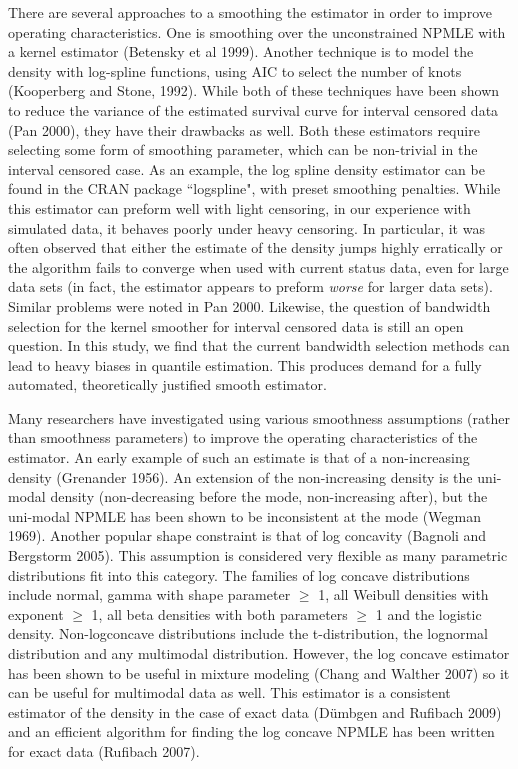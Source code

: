 \documentclass[12pt]{article}
\numberwithin{equation}{section}
\begin{document}
	There are several approaches to a smoothing the estimator in order to improve operating characteristics. One is smoothing over the unconstrained NPMLE with a kernel estimator (Betensky et al 1999). Another technique is to model the density with log-spline functions, using AIC to select the number of knots (Kooperberg and Stone, 1992). While both of these techniques have been shown to reduce the variance of the estimated survival curve for interval censored data (Pan 2000), they have their drawbacks as well. Both these estimators require selecting some form of smoothing parameter, which can be non-trivial in the interval censored case. As an example, the log spline density estimator can be found in the CRAN package  ``logspline", with preset smoothing penalties. While this estimator can preform well with light censoring, in our experience with simulated data, it behaves poorly under heavy censoring. In particular, it was often observed that either the estimate of the density jumps highly erratically or the algorithm fails to converge when used with current status data, even for large data sets (in fact, the estimator appears to preform \emph{worse} for larger data sets). Similar problems were noted in Pan 2000.  Likewise, the question of bandwidth selection for the kernel smoother for interval censored data is still an open question. In this study, we find that the current bandwidth selection methods can lead to heavy biases in quantile estimation. This produces demand for a fully automated, theoretically justified smooth estimator.
	
	Many researchers have investigated using various smoothness assumptions (rather than smoothness parameters) to improve the operating characteristics of the estimator. An early example of such an estimate is that of a non-increasing density (Grenander 1956). An extension of the non-increasing density is the uni-modal density (non-decreasing before the mode, non-increasing after), but the uni-modal NPMLE has been shown to be inconsistent at the mode (Wegman 1969). Another popular shape constraint is that of log concavity (Bagnoli and Bergstorm 2005). This assumption is considered very flexible as many parametric distributions fit into this category. The families of log concave distributions include normal, gamma with shape parameter $\ge$ 1, all Weibull densities with exponent $\ge$ 1, all beta densities with both parameters $\ge$ 1 and the logistic density. Non-logconcave distributions include the t-distribution, the lognormal distribution and any multimodal distribution. However, the log concave estimator has been shown to be useful in mixture modeling (Chang and Walther 2007) so it can be useful for multimodal data as well. This estimator is a consistent estimator of the density in the case of exact data (D\"umbgen and Rufibach 2009) and an efficient algorithm for finding the log concave NPMLE has been written for exact data (Rufibach 2007). 
		
\end{document}
